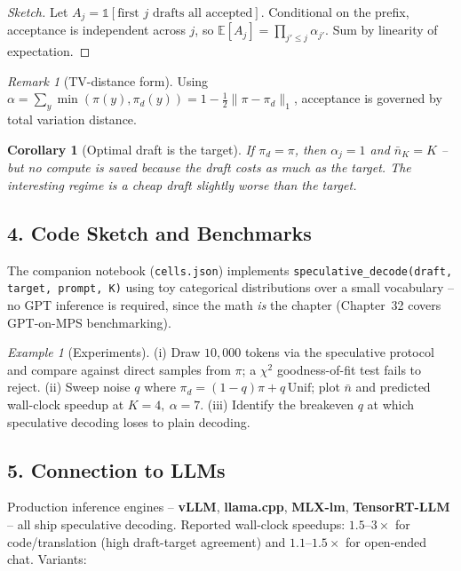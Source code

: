 \documentclass[11pt]{article}
\newtheorem{corollary}[theorem]{Corollary}
\theoremstyle{remark}
\newtheorem{example}[theorem]{Example}
\newtheorem{remark}[theorem]{Remark}
\begin{document}
\begin{proof}[Sketch]
Let $A_j = \mathbb{1}[\text{first }j\text{ drafts all accepted}]$. Conditional on the prefix, acceptance is independent across $j$, so $\mathbb{E}[A_j] = \prod_{j'\le j}\alpha_{j'}$. Sum by linearity of expectation. \qedhere
\end{proof}

\begin{remark}[TV-distance form]
Using $\alpha = \sum_y \min(\pi(y), \pi_d(y)) = 1 - \tfrac{1}{2}\|\pi - \pi_d\|_1$, acceptance is governed by total variation distance.
\end{remark}

\begin{corollary}[Optimal draft is the target]\label{cor:optimal}
If $\pi_d = \pi$, then $\alpha_j = 1$ and $\bar n_K = K$ -- but no compute is saved because the draft costs as much as the target. The interesting regime is a cheap draft slightly worse than the target.
\end{corollary}

\subsection*{4. Code Sketch and Benchmarks}

The companion notebook (\texttt{cells.json}) implements \texttt{speculative\_decode(draft, target, prompt, K)} using toy categorical distributions over a small vocabulary -- no GPT inference is required, since the math \emph{is} the chapter (Chapter~32 covers GPT-on-MPS benchmarking).

\begin{example}[Experiments]
(i) Draw $10{,}000$ tokens via the speculative protocol and compare against direct samples from $\pi$; a $\chi^2$ goodness-of-fit test fails to reject. (ii) Sweep noise $q$ where $\pi_d = (1-q)\pi + q\,\mathrm{Unif}$; plot $\bar n$ and predicted wall-clock speedup at $K=4,\ \alpha=7$. (iii) Identify the breakeven $q$ at which speculative decoding loses to plain decoding.
\end{example}

\subsection*{5. Connection to LLMs}

Production inference engines -- \textbf{vLLM}, \textbf{llama.cpp}, \textbf{MLX-lm}, \textbf{TensorRT-LLM} -- all ship speculative decoding. Reported wall-clock speedups: $1.5$--$3\times$ for code/translation (high draft-target agreement) and $1.1$--$1.5\times$ for open-ended chat. Variants:
\end{document}
